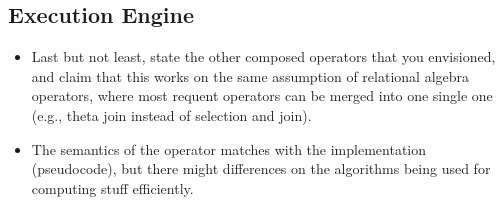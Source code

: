 
\subsection{Execution Engine} \label{ssec:xltlf}
\begin{itemize}
	\item Last but not least, state the other composed operators that you envisioned, and claim that this works on the same assumption of relational algebra operators, where most requent operators can be merged into one single one (e.g., theta join instead of selection and join).
	\item The semantics of the operator matches with the implementation (pseudocode), but there might differences on the algorithms being used for computing stuff efficiently.
\end{itemize}